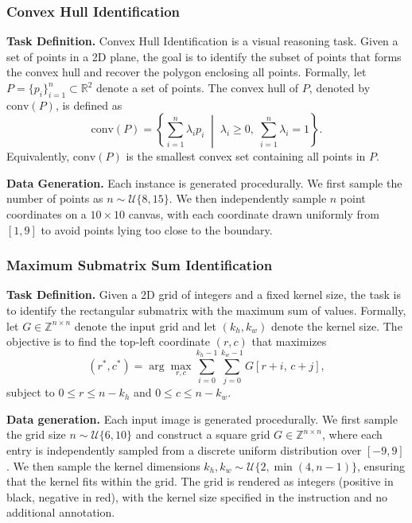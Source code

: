 \subsubsection{Convex Hull Identification}
\textbf{Task Definition.}
Convex Hull Identification is a visual reasoning task. Given a set of points in
a 2D plane, the goal is to identify the subset of points that forms the convex
hull and recover the polygon enclosing all points. Formally, let
\(P = \{p_i\}_{i=1}^n \subset \mathbb{R}^2\) denote a set of points. The convex
hull of \(P\), denoted by \(\mathrm{conv}(P)\), is defined as
\begin{equation}
\mathrm{conv}(P) =
\left\{
\sum_{i=1}^n \lambda_i p_i \;\middle|\;
\lambda_i \ge 0,\;
\sum_{i=1}^n \lambda_i = 1
\right\}.
\end{equation}
Equivalently, \(\mathrm{conv}(P)\) is the smallest convex set containing all
points in \(P\). 

\textbf{Data Generation.}
Each instance is generated procedurally. We first sample the number of points
as \(n \sim \mathcal{U}\{8,15\}\). We then independently sample \(n\) point
coordinates on a \(10 \times 10\) canvas, with each coordinate drawn uniformly
from \([1,9]\) to avoid points lying too close to the boundary.

\subsubsection{Maximum Submatrix Sum Identification}
\textbf{Task Definition.}
Given a 2D grid of integers and a fixed kernel size, the task is to identify
the rectangular submatrix with the maximum sum of values.
Formally, let \(G \in \mathbb{Z}^{n \times n}\) denote the input grid and let
\((k_h, k_w)\) denote the kernel size. The objective is to find the top-left
coordinate \((r, c)\) that maximizes
\begin{equation}
(r^*, c^*) = \arg\max_{r, c}
\sum_{i=0}^{k_h-1} \sum_{j=0}^{k_w-1} G[r+i,\, c+j],
\end{equation}
subject to \(0 \le r \le n-k_h\) and \(0 \le c \le n-k_w\).

\textbf{Data generation.}
Each input image is generated procedurally. We first sample the grid size
\(n \sim \mathcal{U}\{6,10\}\) and construct a square grid
\(G \in \mathbb{Z}^{n \times n}\), where each entry is independently sampled
from a discrete uniform distribution over \([-9,9]\). We then sample the kernel
dimensions \(k_h, k_w \sim \mathcal{U}\{2, \min(4, n-1)\}\), ensuring that the
kernel fits within the grid. The grid is rendered as integers (positive in black, negative in red), with the
kernel size specified in the instruction and no additional annotation.

